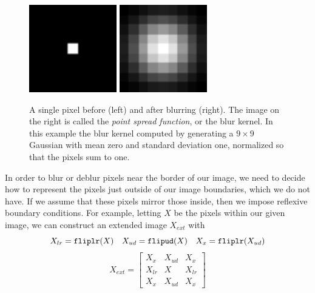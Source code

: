 \documentclass[10pt,a4paper]{article}
\begin{document}
\begin{figure}[H]
\centering
\includegraphics[width=1.5in]{../figures/pixel} \hspace{2em}
\includegraphics[width=1.5in]{../figures/psf}
\caption{A single pixel before (left) and after blurring (right). The image on the right is called the \emph{point spread function}, or the blur kernel. In this example the blur kernel computed by generating a $9 \times 9$ Gaussian with mean zero and standard deviation one, normalized so that the pixels sum to one.  }
\end{figure}

In order to blur or deblur pixels near the border of our image, we need to decide how to represent the pixels just outside of our image boundaries, which we do not have. If we assume that these pixels mirror those inside, then we impose reflexive boundary conditions. For example, letting $X$ be the pixels within our given image, we can construct an extended image $X_{ext}$ with
\[ X_{lr} = {\tt fliplr}(X) \quad X_{ud} = {\tt flipud}(X) \quad X_x = {\tt fliplr}(X_{ud}) \]
\[ X_{ext} = \begin{bmatrix} X_x & X_{ud} & X_x \\ X_{lr} & X & X_{lr} \\ X_x & X_{ud} & X_x \end{bmatrix} \]
\end{document}
